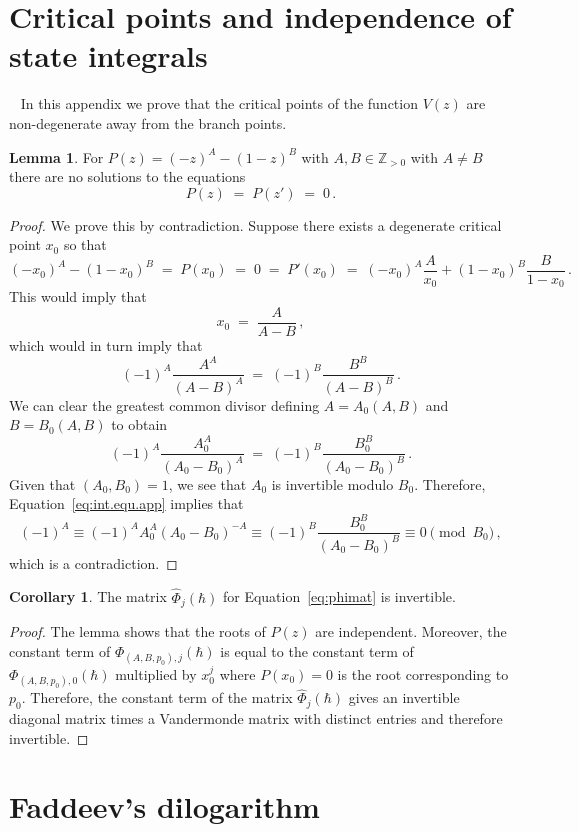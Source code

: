 \documentclass[12pt,reqno]{amsart}
\theoremstyle{definition}
\newtheorem{lemma}[theorem]{Lemma}
\newtheorem{corollary}[theorem]{Corollary}
\def\BZ{\mathbb Z}
\def\be{\begin{equation}}
\def\ee{\end{equation}}
\renewcommand{\=}{\;=\;}
\begin{document}
\section{Critical points and independence of state integrals}~\label{app:crit.pts}
In this appendix we prove that the critical points of the function $V(z)$ are non-degenerate away from the branch points.
\begin{lemma}
For $P(z)=(-z)^A-(1-z)^B$ with $A,B\in\BZ_{>0}$ with $A\neq B$ there are no solutions to the equations
\be
  P(z)\=P(z')\=0\,.
\ee
\end{lemma}
\begin{proof}
We prove this by contradiction. Suppose there exists a degenerate critical point $x_0$ so that
\be
  (-x_0)^A-(1-x_0)^B
  \=P(x_0)
  \=0
  \=P'(x_0)
  \=(-x_0)^A\frac{A}{x_0}+(1-x_0)^B\frac{B}{1-x_0}\,.
\ee
This would imply that
\be
  x_0
  \=
  \frac{A}{A-B}\,,
\ee
which would in turn imply that
\be
  (-1)^A\frac{A^A}{(A-B)^A}
  \=(-1)^B\frac{B^B}{(A-B)^B}\,.
\ee
We can clear the greatest common divisor defining $A=A_0(A,B)$ and $B=B_0(A,B)$ to obtain
\be\label{eq:int.equ.app}
  (-1)^A\frac{A_0^A}{(A_0-B_0)^A}
  \=(-1)^B\frac{B_0^B}{(A_0-B_0)^B}\,.
\ee
Given that $(A_0,B_0)=1$, we see that $A_0$ is invertible modulo $B_0$. Therefore, Equation~\eqref{eq:int.equ.app}
implies that
\be
  (-1)^A\equiv(-1)^AA_0^A(A_0-B_0)^{-A}\equiv(-1)^B\frac{B_0^B}{(A_0-B_0)^B}\equiv0\pmod{B_0}\,,
\ee
which is a contradiction.
\end{proof}

\begin{corollary}\label{cor:phi.is.invert}
The matrix $\widehat{\Phi}_j(\hbar)$ for Equation~\eqref{eq:phimat} is invertible.
\end{corollary}
\begin{proof}
The lemma shows that the roots of $P(z)$ are independent. Moreover, the constant term of $\Phi_{(A,B,p_0),j}(\hbar)$ is equal to the constant term of $\Phi_{(A,B,p_0),0}(\hbar)$ multiplied by $x_0^j$ where $P(x_0)=0$ is the root corresponding to $p_0$. Therefore, the constant term of the matrix $\widehat{\Phi}_j(\hbar)$ gives an invertible diagonal matrix times a Vandermonde matrix with distinct entries and therefore invertible.
\end{proof}

\section{Faddeev's dilogarithm}\label{app:Faddeev}
\end{document}
